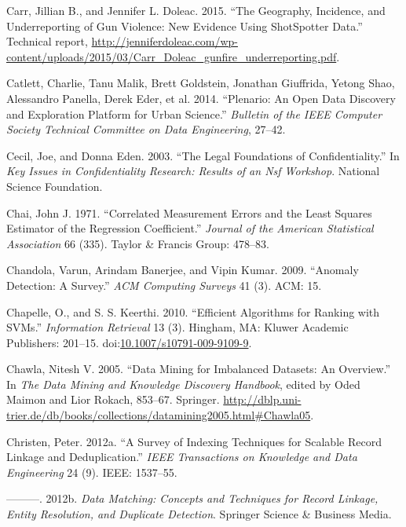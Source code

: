 \documentclass[]{krantz}
\begin{document}
\hypertarget{ref-carr2015geography}{}
Carr, Jillian B., and Jennifer L. Doleac. 2015. ``The Geography,
Incidence, and Underreporting of Gun Violence: New Evidence Using
ShotSpotter Data.'' Technical report,
\url{http://jenniferdoleac.com/wp-content/uploads/2015/03/Carr_Doleac_gunfire_underreporting.pdf}.

\hypertarget{ref-plenario}{}
Catlett, Charlie, Tanu Malik, Brett Goldstein, Jonathan Giuffrida,
Yetong Shao, Alessandro Panella, Derek Eder, et al. 2014. ``Plenario: An
Open Data Discovery and Exploration Platform for Urban Science.''
\emph{Bulletin of the IEEE Computer Society Technical Committee on Data
Engineering}, 27--42.

\hypertarget{ref-Cecil2003}{}
Cecil, Joe, and Donna Eden. 2003. ``The Legal Foundations of
Confidentiality.'' In \emph{Key Issues in Confidentiality Research:
Results of an Nsf Workshop}. National Science Foundation.

\hypertarget{ref-chai1971correlated}{}
Chai, John J. 1971. ``Correlated Measurement Errors and the Least
Squares Estimator of the Regression Coefficient.'' \emph{Journal of the
American Statistical Association} 66 (335). Taylor \& Francis Group:
478--83.

\hypertarget{ref-chandola2009anomaly}{}
Chandola, Varun, Arindam Banerjee, and Vipin Kumar. 2009. ``Anomaly
Detection: A Survey.'' \emph{ACM Computing Surveys} 41 (3). ACM: 15.

\hypertarget{ref-Chapelle2010}{}
Chapelle, O., and S. S. Keerthi. 2010. ``Efficient Algorithms for
Ranking with SVMs.'' \emph{Information Retrieval} 13 (3). Hingham, MA:
Kluwer Academic Publishers: 201--15.
doi:\href{https://doi.org/10.1007/s10791-009-9109-9}{10.1007/s10791-009-9109-9}.

\hypertarget{ref-Chawla05}{}
Chawla, Nitesh V. 2005. ``Data Mining for Imbalanced Datasets: An
Overview.'' In \emph{The Data Mining and Knowledge Discovery Handbook},
edited by Oded Maimon and Lior Rokach, 853--67. Springer.
\url{http://dblp.uni-trier.de/db/books/collections/datamining2005.html\#Chawla05}.

\hypertarget{ref-christen2012survey}{}
Christen, Peter. 2012a. ``A Survey of Indexing Techniques for Scalable
Record Linkage and Deduplication.'' \emph{IEEE Transactions on Knowledge
and Data Engineering} 24 (9). IEEE: 1537--55.

\hypertarget{ref-christen2012data}{}
---------. 2012b. \emph{Data Matching: Concepts and Techniques for
Record Linkage, Entity Resolution, and Duplicate Detection}. Springer
Science \& Business Media.
\end{document}
